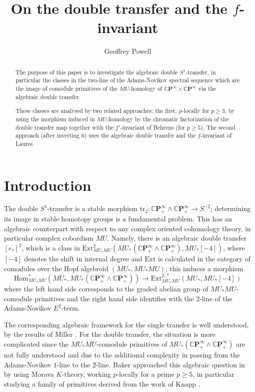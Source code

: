 \documentclass[10pt,a4paper]{amsart}
\title{On the double transfer and the $f$-invariant}
\author{Geoffrey Powell}
\theoremstyle{definition}
\theoremstyle{remark}
\renewcommand{\hom}{\mathrm{Hom}}
\newcommand{\ext}{\mathrm{Ext}}
\newcommand{\cp}{\mathbb{C} \mathbf{P}^\infty}
\renewcommand{\smash}{\wedge}
\begin{document}
\begin{abstract}
The purpose of this paper is to investigate the algebraic  double $S^1$-transfer, in particular the classes in the two-line of the Adams-Novikov spectral sequence which are the image of comodule primitives of the $MU$-homology of $\cp\times \cp$ via the algebraic double transfer.

These classes are analysed by two related approaches; the first, $p$-locally for $p \geq 3$, by using the morphism induced in $MU$-homology by the chromatic factorization of the double transfer map together with the $f'$-invariant of Behrens (for $p \geq 5$). The second approach (after inverting $6$) uses the algebraic double transfer and the $f$-invariant of Laures.
\end{abstract}

\maketitle
%
\section{Introduction}

The double $S^1$-transfer is a stable morphism $\mathrm{tr}_2 : \cp _+ \smash \cp_+
\rightarrow S^{-2}$; determining its image in stable homotopy groups is a fundamental problem. This has an algebraic counterpart with respect to any complex oriented cohomology theory, in particular complex cobordism $MU$. Namely,  there is an algebraic double transfer $[e_\tau]^2$, which is a class in $\ext^2_{MU_* MU} (MU_* (\cp_+\smash \cp_+), MU_* [-4]) $, where $[-4]$ denotes the shift in internal degree and $\ext$ is calculated in the category of comodules over the Hopf algebroid $(MU_*, MU_ *MU)$;  this induces a morphism
\[
	\hom_{MU_* MU}^* (MU_*, MU_* (\cp_+ \smash  \cp_+))
	\rightarrow
	\ext^{2,*}_{MU_* MU} (MU_*, MU_* [-4])
\]
where the left hand side corresponds to the graded abelian group of $MU_*MU$-comodule primitives and the right hand side identifies with the $2$-line of the  Adams-Novikov $E^2$-term.

The corresponding algebraic framework for the single transfer is well understood, by the results of Miller \cite{miller}. For the double transfer, the situation is more complicated since the $MU_*MU$-comodule primitives of $MU_* (\cp_+ \smash \cp_+)$ are not fully understood and due to the additional complexity in passing from the Adams-Novikov $1$-line to the $2$-line. Baker approached this algebraic question in \cite{baker_transfer} by using Morava $K$-theory, working $p$-locally for a prime $p \geq 5$, in particular studying a family of primitives derived from the work of Knapp \cite{knapp_habilit}.
\end{document}
